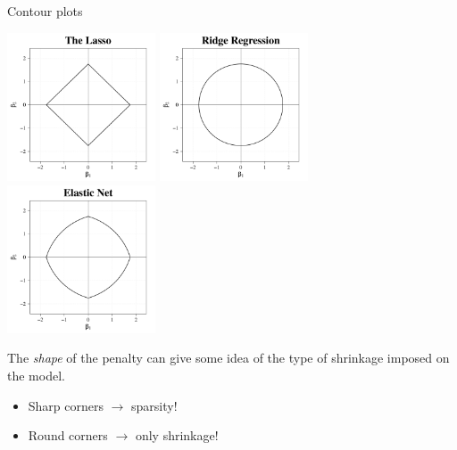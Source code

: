\documentclass[8pt]{beamer}
\begin{document}
\begin{frame}{\color{white} Contour plots}

\begin{center}
    \centering
    \includegraphics[width = 0.33\textwidth]{cont_lasso.pdf}
    \includegraphics[width = 0.33\textwidth]{cont_ridge.pdf}
    \includegraphics[width = 0.33\textwidth]{cont_enet.pdf}
\end{center}

The \textit{shape} of the penalty can give some idea of the type of shrinkage imposed on the model.
\begin{itemize}
    \item Sharp corners $\to$ sparsity! \Laughey[1.5][yellow][pink]
    \item Round corners $\to$ only shrinkage!
\end{itemize}
    
\end{frame}
\end{document}
